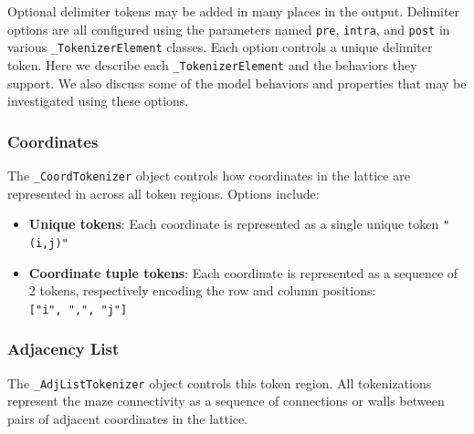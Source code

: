 \documentclass[10pt,a4paper,onecolumn]{article}
\providecommand{\tightlist}{%
  \setlength{\itemsep}{0pt}\setlength{\parskip}{0pt}}
\begin{document}
Optional delimiter tokens may be added in many places in the output.
Delimiter options are all configured using the parameters named
\texttt{pre}, \texttt{intra}, and \texttt{post} in various
\texttt{\_TokenizerElement} classes. Each option controls a unique
delimiter token. Here we describe each \texttt{\_TokenizerElement} and
the behaviors they support. We also discuss some of the model behaviors
and properties that may be investigated using these options.

\hypertarget{coordtokenizer}{%
\subsubsection{Coordinates}\label{coordtokenizer}}

The \texttt{\_CoordTokenizer} object controls how coordinates in the
lattice are represented in across all token regions. Options include:

\begin{itemize}
\tightlist
\item
  \textbf{Unique tokens}: Each coordinate is represented as a single
  unique token \texttt{"(i,j)"}
\item
  \textbf{Coordinate tuple tokens}: Each coordinate is represented as a
  sequence of 2 tokens, respectively encoding the row and column
  positions: \texttt{{[}"i",\ ",",\ "j"{]}}
\end{itemize}

\hypertarget{adjlisttokenizer}{%
\subsubsection{Adjacency List}\label{adjlisttokenizer}}

The \texttt{\_AdjListTokenizer} object controls this token region. All
tokenizations represent the maze connectivity as a sequence of
connections or walls between pairs of adjacent coordinates in the
lattice.
\end{document}
